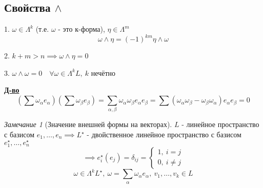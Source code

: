 \documentclass[a4paper]{article}
\theoremstyle{definition}
\theoremstyle{remark}
\newtheorem*{remark}{Замечание}
\begin{document}
\subsection*{Свойства $ \wedge $} 
1. $ \omega \in \Lambda^k $ (т.е. $ \omega $ - это к-форма), $ \eta \in \Lambda^m $  
\[
    \omega \wedge \eta = (-1)^{km} \eta \wedge \omega
\]

2. $ k+m > n \implies \omega \wedge \eta = 0 $ 

3. $ \omega \wedge \omega = 0 \quad \forall \omega \in \Lambda^k L, \ k $ нечётно

\textbf{\underline{Д-во}}
\[
    \left(\sum \omega_{\alpha} e_{\alpha}\right) \left(\sum \omega_{\beta} e_{\beta}\right)
    = \sum_{\alpha,\beta} \omega_{\alpha} \omega_{\beta} e_{\alpha} e_{\beta}
    = \sum (\omega_{\alpha} \omega_{\beta} - \omega_{\beta} \omega_{\alpha})
    e_{\alpha} e_{\beta} = 0
\]

\begin{tcolorbox}
\begin{remark}[Значение внешней формы на векторах]
    $ L $ - линейное пространство с базисом $ e_1, \dots, e_n \implies L^{\star} $ -
    двойственное линейное пространство с базисом $ e^{\star}_1, \dots, e^{\star}_n $
    \[
        \implies e_i^{\star}(e_j) = \delta_{ij} = 
        \begin{cases}
            1, \ i = j\\
            0, \ i \neq j
        \end{cases}
    \]
    \[
        \omega \in \Lambda^k L^{\star}, \ \omega = \sum_{\alpha}
        \omega_{\alpha} e_{\alpha}, \ v_1, \dots, v_k \in L
    \]
\end{remark}
\end{tcolorbox}
\end{document}
